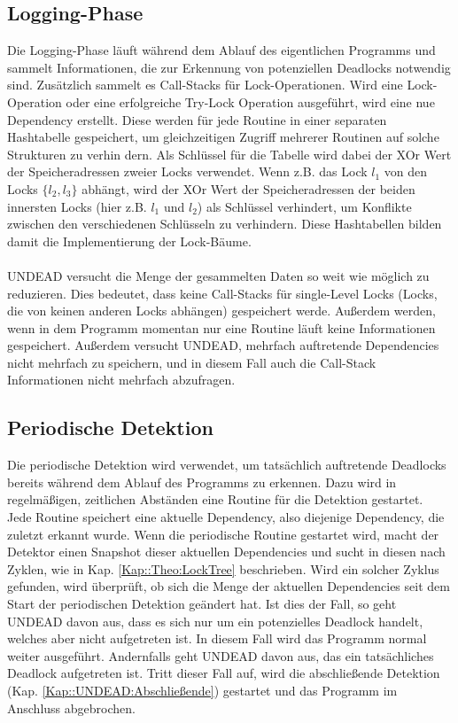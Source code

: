 \subsection{Logging-Phase}
Die Logging-Phase läuft während dem Ablauf des eigentlichen Programms und sammelt
Informationen, die zur Erkennung von potenziellen Deadlocks notwendig sind. 
Zusätzlich sammelt es Call-Stacks für Lock-Operationen. Wird eine Lock-Operation
oder eine erfolgreiche Try-Lock Operation ausgeführt, wird eine nue Dependency 
erstellt. Diese werden für jede Routine in einer separaten 
Hashtabelle gespeichert, um gleichzeitigen Zugriff mehrerer Routinen auf solche 
Strukturen zu verhin
dern. Als Schlüssel für die Tabelle wird dabei der XOr 
Wert der Speicheradressen zweier Locks verwendet. Wenn z.B. das Lock $l_1$ 
von den Locks $\{l_2, l_3\}$ abhängt, wird der XOr Wert der Speicheradressen der 
beiden innersten Locks (hier z.B. $l_1$ und $l_2$) als Schlüssel verhindert, um 
Konflikte zwischen den verschiedenen Schlüsseln zu verhindern. Diese 
Hashtabellen bilden damit die Implementierung der Lock-Bäume.\\\\
UNDEAD versucht die Menge der gesammelten Daten so weit wie möglich zu reduzieren.
Dies bedeutet, dass keine Call-Stacks für single-Level Locks (Locks, die von 
keinen anderen Locks abhängen) gespeichert werde.
Außerdem werden, wenn in dem Programm momentan nur eine Routine läuft keine 
Informationen gespeichert. Außerdem versucht UNDEAD, mehrfach auftretende
Dependencies nicht mehrfach zu speichern, und in diesem Fall auch die Call-Stack
Informationen nicht mehrfach abzufragen.
\subsection{Periodische Detektion}
Die periodische Detektion wird verwendet, um tatsächlich auftretende Deadlocks bereits während dem 
Ablauf des Programms zu erkennen. Dazu wird in regelmäßigen, zeitlichen 
Abständen eine Routine für die Detektion gestartet.\\
Jede Routine speichert eine 
aktuelle Dependency, also diejenige Dependency, die zuletzt erkannt wurde.
Wenn die periodische Routine gestartet wird, macht der Detektor einen Snapshot
dieser aktuellen Dependencies und sucht in diesen nach Zyklen, wie in Kap.
\ref{Kap::Theo:LockTree} beschrieben. Wird ein solcher Zyklus gefunden, wird 
überprüft, ob sich die Menge der aktuellen Dependencies seit dem Start der 
periodischen Detektion geändert hat. Ist dies der Fall, so geht UNDEAD davon aus,
dass es sich nur um ein potenzielles Deadlock handelt, welches aber nicht 
aufgetreten ist. In diesem Fall wird das Programm normal weiter ausgeführt.
Andernfalls geht UNDEAD davon aus, das ein tatsächliches Deadlock aufgetreten 
ist. Tritt dieser Fall auf, wird die 
abschließende Detektion (Kap. \ref{Kap::UNDEAD:Abschließende}) gestartet 
und das Programm im Anschluss abgebrochen. 
